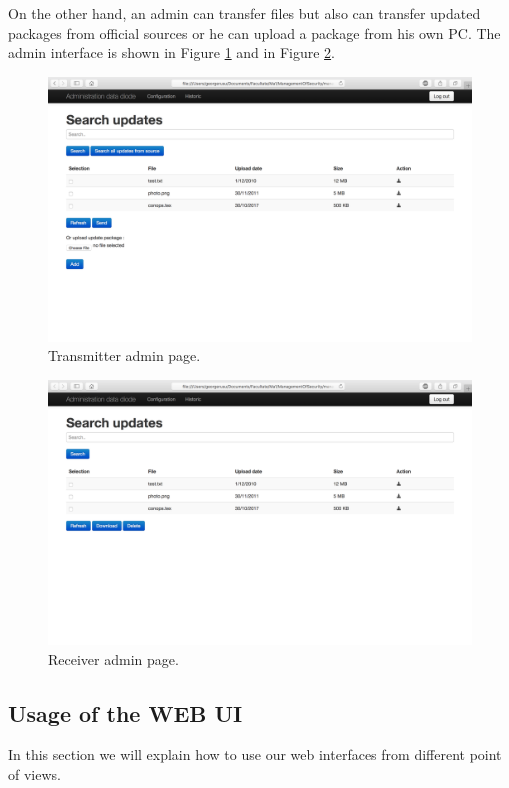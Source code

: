 \documentclass[a4paper,10pt]{article}
\begin{document}
On the other hand, an admin can transfer files but also can transfer updated packages from official sources or he can upload a package from his own PC. The admin interface is shown in Figure \ref{fig:transadminpage}
and in Figure \ref{fig:receiveradminpage}.
\begin{figure}[!h]
\centering
\includegraphics[scale=0.35]{images/admintransmitter.png}
\caption{Transmitter admin page.}
\label{fig:transadminpage}
\end{figure}

\begin{figure}[!h]
\centering
\includegraphics[scale=0.35]{images/adminreceiver.png}
\caption{Receiver admin page.}
\label{fig:receiveradminpage}
\end{figure}
\clearpage
\subsection{Usage of the WEB UI}
In this section we will explain how to use our web interfaces from different point of views.
\end{document}
